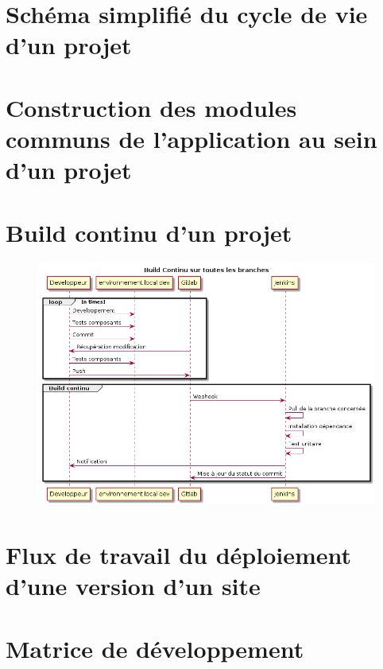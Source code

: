\section{Schéma simplifié du cycle de vie d'un projet}

\clearpage
\section{Construction des modules communs de l'application au sein d'un projet \naq}

\clearpage
\section{Build continu d'un projet \naq}
\begin{figure}[ht]
	\centering
	\includegraphics[scale=0.6,angle=-90]{img/build-continu.png}
	\label{annexe:build-continu}
\end{figure}

\clearpage
\section{Flux de travail du déploiement d'une version d'un site \naq}

\clearpage
\section{Matrice de développement \devops}

